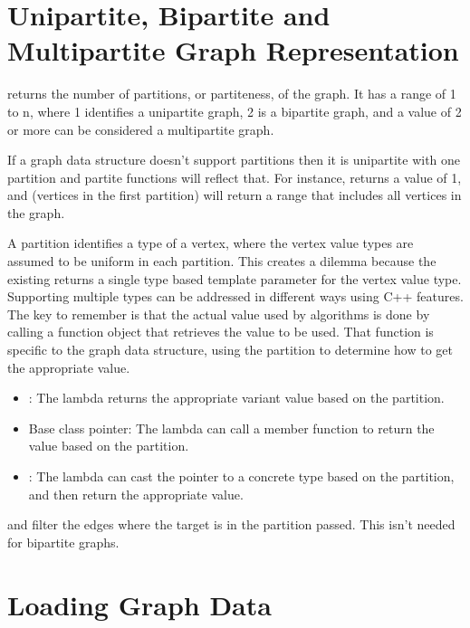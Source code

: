 \section{Unipartite, Bipartite and Multipartite Graph Representation}

 returns the number of partitions, or partiteness, of the graph. It has a range of 1 to n, where 1 identifies 
a unipartite graph, 2 is a bipartite graph, and a value of 2 or more can be considered a multipartite graph. 

If a graph data structure doesn't support partitions then it is unipartite with one partition and partite functions will reflect that. 
For instance,  returns a value of 1, and  (vertices in the first partition) will return a range that includes all vertices in the graph.

A partition identifies a type of a vertex, where the vertex value types are assumed to be uniform in each partition. This creates a dilemma because 
the existing  returns a single type based template parameter for the vertex value type. Supporting 
multiple types can be addressed in different ways using C++ features. The key to remember is that the actual value used by algorithms is done
by calling a function object that retrieves the value to be used. That function is specific to the graph data structure, using the partition to 
determine how to get the appropriate value.
\begin{itemize}
    \item
          : The lambda returns the appropriate variant value based on the partition.
    \item
          Base class pointer: The lambda can call a member function to return the value based on the partition.
    \item
          : The lambda can cast the pointer to a concrete type based on the partition, and
          then return the appropriate value.
\end{itemize}

 and  filter the edges where the target is in the partition  passed.
This isn't needed for bipartite graphs.

\section{Loading Graph Data}

